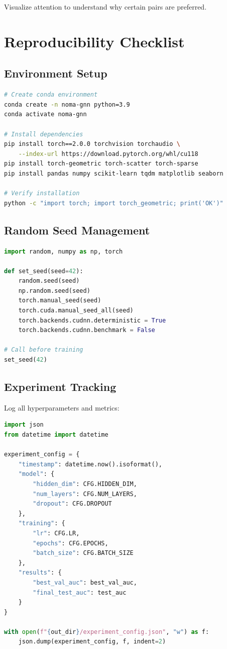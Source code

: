 \documentclass[12pt,a4paper]{article}
\begin{document}
Visualize attention to understand why certain pairs are preferred.

\section{Reproducibility Checklist}

\subsection{Environment Setup}

\begin{lstlisting}[language=bash]
# Create conda environment
conda create -n noma-gnn python=3.9
conda activate noma-gnn

# Install dependencies
pip install torch==2.0.0 torchvision torchaudio \
    --index-url https://download.pytorch.org/whl/cu118
pip install torch-geometric torch-scatter torch-sparse
pip install pandas numpy scikit-learn tqdm matplotlib seaborn

# Verify installation
python -c "import torch; import torch_geometric; print('OK')"
\end{lstlisting}

\subsection{Random Seed Management}

\begin{lstlisting}[language=Python]
import random, numpy as np, torch

def set_seed(seed=42):
    random.seed(seed)
    np.random.seed(seed)
    torch.manual_seed(seed)
    torch.cuda.manual_seed_all(seed)
    torch.backends.cudnn.deterministic = True
    torch.backends.cudnn.benchmark = False

# Call before training
set_seed(42)
\end{lstlisting}

\subsection{Experiment Tracking}

Log all hyperparameters and metrics:
\begin{lstlisting}[language=Python]
import json
from datetime import datetime

experiment_config = {
    "timestamp": datetime.now().isoformat(),
    "model": {
        "hidden_dim": CFG.HIDDEN_DIM,
        "num_layers": CFG.NUM_LAYERS,
        "dropout": CFG.DROPOUT
    },
    "training": {
        "lr": CFG.LR,
        "epochs": CFG.EPOCHS,
        "batch_size": CFG.BATCH_SIZE
    },
    "results": {
        "best_val_auc": best_val_auc,
        "final_test_auc": test_auc
    }
}

with open(f"{out_dir}/experiment_config.json", "w") as f:
    json.dump(experiment_config, f, indent=2)
\end{lstlisting}
\end{document}

